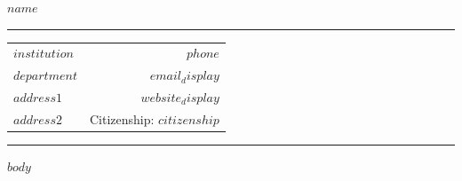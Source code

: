 \documentclass[10pt,letterpaper]{article}
\begin{document}
\begin{center}
    {\rmfamily\bfseries\fontsize{13}{15.6}\selectfont $name$}
\end{center}
\hrule
\vspace{1ex}
\begin{tabularx}{\textwidth}{@{}X r@{}}
$institution$ & $phone$ \\
$department$ & \href{mailto:$email$}{$email_display$} \\
$address1$ & \href{$website$}{$website_display$} \\
$address2$ & Citizenship: $citizenship$ \\
\end{tabularx}
\vspace{1ex}
\hrule

\bigskip

$body$
\end{document}
